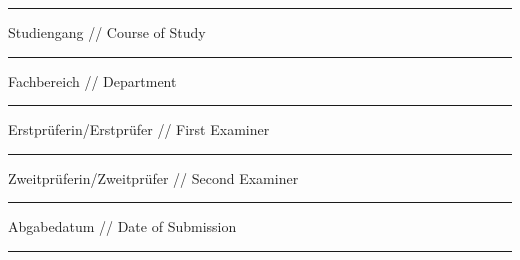 {\begin{titlepage}
			\noindent\rule{15cm}{0.4pt}
			
			\vskip 0.05cm

			\begingroup
			\fontsize{8pt}{6pt}\selectfont
			Studiengang // Course of Study
			\endgroup

			\vskip -0.15cm

			\begingroup
			\fontsize{12pt}{14pt}\selectfont
				{\@courseOfStudies}
			\endgroup
			\vskip -0.15cm

			\noindent\rule{15cm}{0.4pt}
			
			\vskip 0.05cm

			\begingroup
			\fontsize{8pt}{6pt}\selectfont
			Fachbereich // Department
			\endgroup

			\vskip -0.15cm

			\begingroup
			\fontsize{12pt}{14pt}\selectfont
				{\@discipline}
			\endgroup
			\vskip -0.15cm

			\noindent\rule{15cm}{0.4pt}
			
			\vskip 0.05cm

			\begingroup
			\fontsize{8pt}{6pt}\selectfont
			Erstprüferin/Erstprüfer // First Examiner
			\endgroup

			\vskip -0.15cm

			\begingroup
			\fontsize{12pt}{14pt}\selectfont
				{\@firstExaminer}
			\endgroup
			\vskip -0.15cm

			\noindent\rule{15cm}{0.4pt}
			
			\vskip 0.05cm

			\begingroup
			\fontsize{8pt}{6pt}\selectfont
			Zweitprüferin/Zweitprüfer // Second Examiner
			\endgroup

			\vskip -0.15cm

			\begingroup
			\fontsize{12pt}{14pt}\selectfont
				{\@secondExaminer}
			\endgroup
			\vskip -0.15cm

			\noindent\rule{15cm}{0.4pt}
			
			\vskip 0.05cm

			\begingroup
			\fontsize{8pt}{6pt}\selectfont
			Abgabedatum // Date of Submission
			\endgroup

			\vskip -0.15cm

			\begingroup
			\fontsize{12pt}{14pt}\selectfont
				{\@submitDate}
			\endgroup
			\vskip -0.15cm

			\noindent\rule{15cm}{0.4pt}
		\restoregeometry
	\end{titlepage}
}
\makeatother
